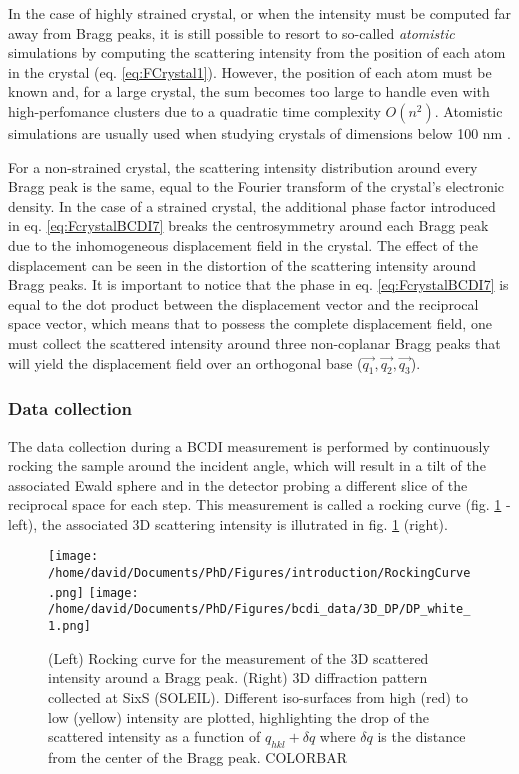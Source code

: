 In the case of highly strained crystal, or when the intensity must be computed far away from Bragg peaks, it is still possible to resort to so-called \textit{atomistic} simulations by computing the scattering intensity from the position of each atom in the crystal (eq. \ref{eq:FCrystal1}).
However, the position of each atom must be known and, for a large crystal, the sum becomes too large to handle even with high-perfomance clusters due to a quadratic time complexity $O(n^2)$.
Atomistic simulations are usually used when studying crystals of dimensions below 100 nm \parencite{Dupraz2022}.

For a non-strained crystal, the scattering intensity distribution around every Bragg peak is the same, equal to the Fourier transform of the crystal's electronic density.
In the case of a strained crystal, the additional phase factor introduced in eq. \ref{eq:FcrystalBCDI7} breaks the centrosymmetry around each Bragg peak due to the inhomogeneous displacement field in the crystal.
The effect of the displacement can be seen in the distortion of the scattering intensity around Bragg peaks.
It is important to notice that the phase in eq. \ref{eq:FcrystalBCDI7} is equal to the dot product between the displacement vector and the reciprocal space vector, which means that to possess the complete displacement field, one must collect the scattered intensity around three non-coplanar Bragg peaks \parencite{Newton2010} that will yield the displacement field over an orthogonal base ($\vec{q_1}, \vec{q_2}, \vec{q_3}$).

\subsubsection{Data collection} \label{sec:DataCollectionBCDI}

The data collection during a BCDI measurement is performed by continuously rocking the sample around the incident angle, which will result in a tilt of the associated Ewald sphere and in the detector probing a different slice of the reciprocal space for each step.
This measurement is called a rocking curve (fig. \ref{fig:3DDP} - left), the associated 3D scattering intensity is illutrated in fig. \ref{fig:3DDP} (right).

\begin{figure}[!htb]
    \centering
    \texttt{[image: /home/david/Documents/PhD/Figures/introduction/RockingCurve.png]}
    \texttt{[image: /home/david/Documents/PhD/Figures/bcdi\_data/3D\_DP/DP\_white\_1.png]}
    \caption{
    (Left) Rocking curve for the measurement of the 3D scattered intensity around a Bragg peak.
    (Right) 3D diffraction pattern collected at SixS (SOLEIL).
    Different iso-surfaces from high (red) to low (yellow) intensity are plotted, highlighting the drop of the scattered intensity as a function of $q_{hkl}+\delta q$ where $\delta q$ is the distance from the center of the Bragg peak.
    COLORBAR
    }
    \label{fig:3DDP}
\end{figure}

